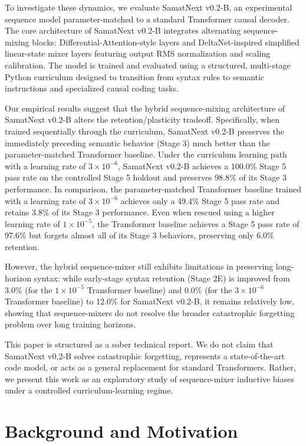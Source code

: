 \documentclass[11pt,a4paper]{article}
\begin{document}
To investigate these dynamics, we evaluate SamatNext v0.2-B, an experimental sequence model parameter-matched to a standard Transformer causal decoder. The core architecture of SamatNext v0.2-B integrates alternating sequence-mixing blocks: Differential-Attention-style layers and DeltaNet-inspired simplified linear-state mixer layers featuring output RMS normalization and scaling calibration. The model is trained and evaluated using a structured, multi-stage Python curriculum designed to transition from syntax rules to semantic instructions and specialized causal coding tasks.

Our empirical results suggest that the hybrid sequence-mixing architecture of SamatNext v0.2-B alters the retention/plasticity tradeoff. Specifically, when trained sequentially through the curriculum, SamatNext v0.2-B preserves the immediately preceding semantic behavior (Stage 3) much better than the parameter-matched Transformer baseline. Under the curriculum learning path with a learning rate of $3\times 10^{-6}$, SamatNext v0.2-B achieves a 100.0\% Stage 5 pass rate on the controlled Stage 5 holdout and preserves 98.8\% of its Stage 3 performance. In comparison, the parameter-matched Transformer baseline trained with a learning rate of $3\times 10^{-6}$ achieves only a 49.4\% Stage 5 pass rate and retains 3.8\% of its Stage 3 performance. Even when rescued using a higher learning rate of $1\times 10^{-5}$, the Transformer baseline achieves a Stage 5 pass rate of 97.6\% but forgets almost all of its Stage 3 behaviors, preserving only 6.0\% retention.

However, the hybrid sequence-mixer still exhibits limitations in preserving long-horizon syntax: while early-stage syntax retention (Stage 2E) is improved from 3.0\% (for the $1\times 10^{-5}$ Transformer baseline) and 0.0\% (for the $3\times 10^{-6}$ Transformer baseline) to 12.0\% for SamatNext v0.2-B, it remains relatively low, showing that sequence-mixers do not resolve the broader catastrophic forgetting problem over long training horizons.

This paper is structured as a sober technical report. We do not claim that SamatNext v0.2-B solves catastrophic forgetting, represents a state-of-the-art code model, or acts as a general replacement for standard Transformers. Rather, we present this work as an exploratory study of sequence-mixer inductive biases under a controlled curriculum-learning regime.

\section{Background and Motivation}
\end{document}
